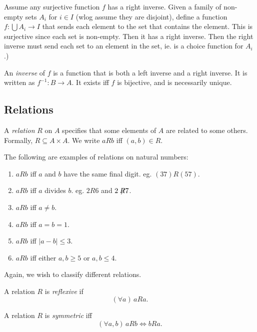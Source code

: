 \documentclass[a4paper]{article}
\begin{document}
Assume any surjective function $f$ has a right inverse. Given a family of non-empty sets $A_i$ for $i\in I$ (wlog assume they are disjoint), define a function $f: \bigcup A_i \to I$ that sends each element to the set that contains the element. This is surjective since each set is non-empty. Then it has a right inverse. Then the right inverse must send each set to an element in the set, ie. is a choice function for $A_i$.)


\begin{defi}
  An \emph{inverse} of $f$ is a function that is both a left inverse and a right inverse. It is written as $f^{-1}: B\to A$. It exists iff $f$ is bijective, and is necessarily unique.
\end{defi}

\subsection{Relations}
\begin{defi}[Relation]
  A \emph{relation} $R$ on $A$ specifies that some elements of $A$ are related to some others. Formally, $R\subseteq A\times A$. We write $aRb$ iff $(a, b)\in R$.
\end{defi}

\begin{eg}
  The following are examples of relations on natural numbers:
  \begin{enumerate}
    \item $aRb$ iff $a$ and $b$ have the same final digit. eg. $(37)R(57)$.
    \item $aRb$ iff $a$ divides $b$. eg. $2R6$ and $2\not \!\!R 7$.
    \item $aRb$ iff $a\not= b$.
    \item $aRb$ iff $a = b = 1$.
    \item $aRb$ iff $|a - b|\leq 3$.
    \item $aRb$ iff either $a, b\geq 5$ or $a, b\leq 4$.
  \end{enumerate}
\end{eg}

Again, we wish to classify different relations.
\begin{defi}
  A relation $R$ is \emph{reflexive} if
  \[
    (\forall a)\,aRa.
  \]
\end{defi}

\begin{defi}
  A relation $R$ is \emph{symmetric} iff
  \[
    (\forall a, b)\,aRb\Leftrightarrow bRa.
  \]
\end{defi}
\end{document}
